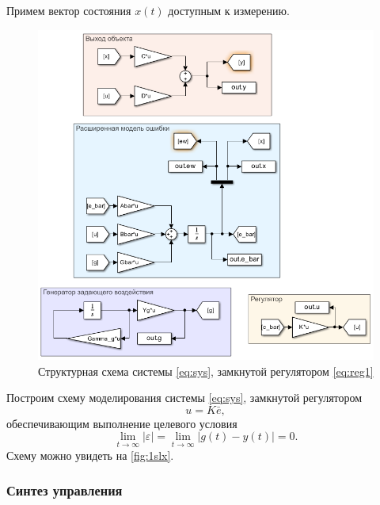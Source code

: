 Примем вектор состояния $x(t)$ доступным к измерению.
\begin{figure}[H]
    \centering
    \includegraphics[width=\linewidth]{figs/1_0_slx.png}
    \caption{Структурная схема системы \eqref{eq:sys}, замкнутой регулятором
    \eqref{eq:reg1}}
    \label{fig:1slx}
\end{figure}
Построим схему 
моделирования системы \eqref{eq:sys}, замкнутой регулятором
\begin{equation}
    \label{eq:reg1}
    u=K\bar e,
\end{equation}
обеспечивающим выполнение целевого условия
\begin{equation}
    \label{eq:aim}
    \lim_{t\rightarrow\infty}|\varepsilon|=\lim_{t\rightarrow\infty}|g(t)-y(t)|=0.
\end{equation}
Схему можно увидеть на \autoref{fig:1slx}. 

\subsubsection{Синтез управления}
\label{sec:reg1}

